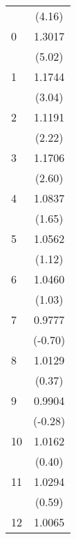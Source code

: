{\begin{tabular}{l*{1}{c}}
                                   &      (4.16)         \\
[1em]
    0                              &      1.3017\sym{***}\\
                                   &      (5.02)         \\
[1em]
    1                              &      1.1744\sym{***}\\
                                   &      (3.04)         \\
[1em]
    2                              &      1.1191\sym{**} \\
                                   &      (2.22)         \\
[1em]
    3                              &      1.1706\sym{***}\\
                                   &      (2.60)         \\
[1em]
    4                              &      1.0837\sym{*}  \\
                                   &      (1.65)         \\
[1em]
    5                              &      1.0562         \\
                                   &      (1.12)         \\
[1em]
    6                              &      1.0460         \\
                                   &      (1.03)         \\
[1em]
    7                              &      0.9777         \\
                                   &     (-0.70)         \\
[1em]
    8                              &      1.0129         \\
                                   &      (0.37)         \\
[1em]
    9                              &      0.9904         \\
                                   &     (-0.28)         \\
[1em]
   10                              &      1.0162         \\
                                   &      (0.40)         \\
[1em]
   11                              &      1.0294         \\
                                   &      (0.59)         \\
[1em]
   12                              &      1.0065         \\

\end{tabular}}
